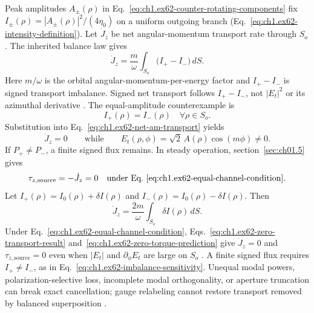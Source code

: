 Peak amplitudes $A_\pm(\rho)$ in Eq.~\eqref{eq:ch1.ex62-counter-rotating-components} fix $I_\pm(\rho)=|A_\pm(\rho)|^2/(4\eta_0)$ on a uniform outgoing branch (Eq.~\eqref{eq:ch1.ex62-intensity-definition}). Let
\(\dot J_z\) be net angular-momentum transport rate through \(S_o\). The inherited
balance law gives
\begin{equation}
\label{eq:ch1.ex62-net-am-transport}
\dot J_z
=
\frac{m}{\omega}
\int_{S_o}\!\big(I_+-I_-\big)\,dS.
\end{equation}
Here \(m/\omega\) is the orbital angular-momentum-per-energy factor and \(I_+-I_-\) is
signed transport imbalance. Signed net transport follows \(I_+-I_-\), not \(|E_t|^2\) or its azimuthal derivative \cite{stratton1941}. The equal-amplitude counterexample is
\begin{equation}
\label{eq:ch1.ex62-equal-channel-condition}
I_+(\rho)=I_-(\rho)\quad\forall \rho\in S_o.
\end{equation}
Substitution into Eq.~\eqref{eq:ch1.ex62-net-am-transport} yields
\begin{equation}
\label{eq:ch1.ex62-zero-transport-result}
\dot J_z=0
\qquad\text{while}\qquad
E_t(\rho,\phi)=\sqrt{2}\,A(\rho)\cos(m\phi)\neq 0.
\end{equation}
If \(P_+\neq P_-\), a finite signed flux remains. In steady operation, section~\ref{sec:ch01.5} gives
\begin{equation}
\label{eq:ch1.ex62-zero-torque-prediction}
\tau_{z,\mathrm{source}}
=
-\dot J_z
=
0
\quad\text{under Eq.~\eqref{eq:ch1.ex62-equal-channel-condition}}.
\end{equation}
Let
\(I_+(\rho)=I_0(\rho)+\delta I(\rho)\) and
\(I_-(\rho)=I_0(\rho)-\delta I(\rho)\). Then
\begin{equation}
\label{eq:ch1.ex62-imbalance-sensitivity}
\dot J_z
=
\frac{2m}{\omega}\int_{S_o}\delta I(\rho)\,dS.
\end{equation}
\label{prop:ch1.ex62-phase-insufficiency}
Under Eq.~\eqref{eq:ch1.ex62-equal-channel-condition}, Eqs.~\eqref{eq:ch1.ex62-zero-transport-result} and~\eqref{eq:ch1.ex62-zero-torque-prediction} give \(\dot J_z=0\) and \(\tau_{z,\mathrm{source}}=0\) even when \(|E_t|\) and \(\partial_\phi E_t\) are large on \(S_o\) \cite{stratton1941,beth1936}. A finite signed flux requires \(I_+\neq I_-\), as in Eq.~\eqref{eq:ch1.ex62-imbalance-sensitivity}. Unequal modal powers, polarization-selective loss, incomplete modal orthogonality, or aperture truncation can break exact cancellation; gauge relabeling cannot restore transport removed by balanced superposition \cite{poynting1884,harrington2001}.

